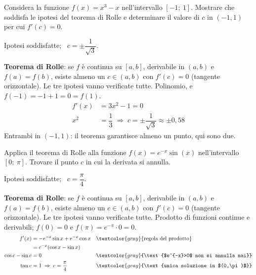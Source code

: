 \begin{question}[ID=1.3, subtitle={Teorema di Rolle per $f(x)=x^3-x$ su $[-1,1]$}, tags={rolle, teoremi}, difficulty=media]
Considera la funzione \(f(x) = x^3 - x\) nell'intervallo \([-1;\ 1]\). Mostrare che soddisfa le ipotesi del teorema di Rolle e determinare il valore di \(c\) in \((-1, 1)\) per cui \(f'(c) = 0\).
\begin{solution}
Ipotesi soddisfatte; \ $c=\pm\dfrac{1}{\sqrt3}$.
\end{solution}
\begin{explanation}
\textbf{Teorema di Rolle}: se $f$ è continua su $[a,b]$, derivabile in $(a,b)$ e $f(a)=f(b)$, esiste almeno un $c\in(a,b)$ con $f'(c)=0$ (tangente orizzontale). Le tre ipotesi vanno verificate tutte.
Polinomio, e $f(-1)=-1+1=0=f(1)$.
\[\begin{aligned}
f'(x) &= 3x^2-1=0\\
x^2 &= \dfrac13 \;\Rightarrow\; c=\pm\dfrac{1}{\sqrt3}\approx\pm0{,}58
\end{aligned}\]
Entrambi in $(-1,1)$: il teorema garantisce almeno un punto, qui sono due.
\end{explanation}
\end{question}


\begin{question}[ID=1.4, subtitle={Teorema di Rolle per $f(x)=e^{-x}\sin(x)$ su $[0,\pi]$}, tags={rolle, teoremi}, difficulty=media]
Applica il teorema di Rolle alla funzione \(f(x) = e^{-x}\sin(x)\) nell'intervallo \([0;\ \pi]\). Trovare il punto \(c\) in cui la derivata si annulla.
\begin{solution}
Ipotesi soddisfatte; \ $c=\dfrac\pi4$.
\end{solution}
\begin{explanation}
\textbf{Teorema di Rolle}: se $f$ è continua su $[a,b]$, derivabile in $(a,b)$ e $f(a)=f(b)$, esiste almeno un $c\in(a,b)$ con $f'(c)=0$ (tangente orizzontale). Le tre ipotesi vanno verificate tutte.
Prodotto di funzioni continue e derivabili; $f(0)=0$ e $f(\pi)=e^{-\pi}\cdot0=0$.
\[\begin{aligned}
f'(x) &= -e^{-x}\sin x+e^{-x}\cos x && \textcolor{gray}{\text{regola del prodotto}}\\
&= e^{-x}(\cos x-\sin x)\\
\cos c-\sin c &= 0 && \textcolor{gray}{\text{$e^{-x}>0$ non si annulla mai}}\\
\tan c &= 1 \;\Rightarrow\; c=\dfrac\pi4 && \textcolor{gray}{\text{unica soluzione in $(0,\pi)$}}
\end{aligned}\]
\end{explanation}
\end{question}

